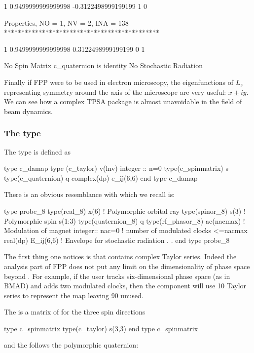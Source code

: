 \documentclass[english,12pt,article]{article} %
\begin{document}
{\begin{example}
   1  0.9499999999999998     -0.3122498999199199       1  0


 Properties, NO =    1, NV =    2, INA =  138
 *********************************************

   1  0.9499999999999998      0.3122498999199199       0  1

  No Spin Matrix
  c_quaternion is identity
 No Stochastic Radiation
\end{example}

Finally if FPP were to be used in electron microscopy, the eigenfunctions of $L_z$ representing symmetry around the axis of the microscope are very useful: $x \pm i y$. We can see how a complex TPSA package is almost unavoidable in the field of beam dynamics.
  
\newpage
  \subsubsection{The type {} }\label{sec:c_damap}
  
  The type   is defined as
  
  \begin{example}
 type c_damap
   type (c_taylor) v(lnv)  
   integer :: n=0 
   type(c_spinmatrix) s 
   type(c_quaternion) q
   complex(dp) e_ij(6,6) 
 end type c_damap
  \end{example}

There is an obvious resemblance  with  which we recall is:
  \begin{example}
    type probe_8
     type(real_8) x(6)     ! Polymorphic orbital ray
     type(spinor_8) s(3)   ! Polymorphic spin s(1:3)
     type(quaternion_8) q 
     type(rf_phasor_8)  ac(nacmax)  ! Modulation of magnet
     integer:: nac=0 !  number of modulated clocks <=nacmax
     real(dp) E_ij(6,6)   !  Envelope for stochastic radiation
           .
           .
  end type probe_8
    \end{example}

The first thing one notices is that   contains  complex Taylor series. Indeed the analysis part of FPP does not put any limit on the dimensionality of phase space beyond . For example, if the user tracks six-dimensional phase space (as in BMAD) and adds two modulated clocks, then the component    will use 10 Taylor series to represent the map leaving 90 unused. 


The  is a matrix of   for the three spin directions
  \begin{example}
  type c_spinmatrix
     type(c_taylor) s(3,3)
  end type c_spinmatrix
      \end{example}
and the  follows the polymorphic quaternion:

}
\end{document}
